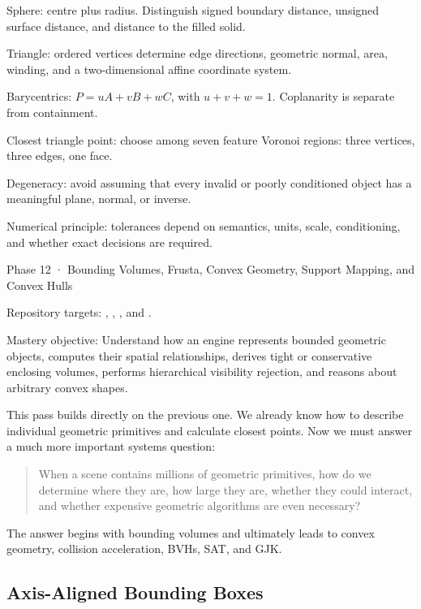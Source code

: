 Sphere: centre plus radius. Distinguish signed boundary distance, unsigned surface distance, and distance to the filled solid.

Triangle: ordered vertices determine edge directions, geometric normal, area, winding, and a two-dimensional affine coordinate system.

Barycentrics: \(P=uA+vB+wC\), with \(u+v+w=1\). Coplanarity is separate from containment.

Closest triangle point: choose among seven feature Voronoi regions: three vertices, three edges, one face.

Degeneracy: avoid assuming that every invalid or poorly conditioned object has a meaningful plane, normal, or inverse.

Numerical principle: tolerances depend on semantics, units, scale, conditioning, and whether exact decisions are required.

Phase 12 · Bounding Volumes, Frusta, Convex Geometry, Support Mapping, and Convex Hulls

Repository targets: , , , and .

Mastery objective: Understand how an engine represents bounded geometric objects, computes their spatial relationships, derives tight or conservative enclosing volumes, performs hierarchical visibility rejection, and reasons about arbitrary convex shapes.

This pass builds directly on the previous one. We already know how to describe individual geometric primitives and calculate closest points. Now we must answer a much more important systems question:

\begin{quote}
When a scene contains millions of geometric primitives, how do we determine where they are, how large they are, whether they could interact, and whether expensive geometric algorithms are even necessary?
\end{quote}

The answer begins with bounding volumes and ultimately leads to convex geometry, collision acceleration, BVHs, SAT, and GJK.

\subsection{Axis-Aligned Bounding Boxes}\label{03-visual-computing-i-ch021-axis-aligned-bounding-boxes}

